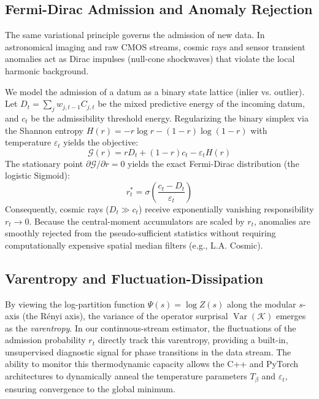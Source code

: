 \subsection{Fermi-Dirac Admission and Anomaly Rejection}
The same variational principle governs the admission of new data. In astronomical imaging and raw CMOS streams, cosmic rays and sensor transient anomalies act as Dirac impulses (null-cone shockwaves) that violate the local harmonic background.

We model the admission of a datum as a binary state lattice (inlier vs. outlier). Let $D_t = \sum_j w_{j,t-1} C_{j,t}$ be the mixed predictive energy of the incoming datum, and $c_t$ be the admissibility threshold energy. Regularizing the binary simplex via the Shannon entropy $H(r) = -r \log r - (1-r) \log (1-r)$ with temperature $\varepsilon_t$ yields the objective:
\begin{equation}
    \mathcal{G}(r) = r D_t + (1-r)c_t - \varepsilon_t H(r)
\end{equation}
The stationary point $\partial \mathcal{G} / \partial r = 0$ yields the exact Fermi-Dirac distribution (the logistic Sigmoid):
\begin{equation}
    r_t^* = \sigma \left( \frac{c_t - D_t}{\varepsilon_t} \right)
\end{equation}
Consequently, cosmic rays ($D_t \gg c_t$) receive exponentially vanishing responsibility $r_t \to 0$. Because the central-moment accumulators are scaled by $r_t$, anomalies are smoothly rejected from the pseudo-sufficient statistics without requiring computationally expensive spatial median filters (e.g., L.A. Cosmic).

\subsection{Varentropy and Fluctuation-Dissipation}
By viewing the log-partition function $\Psi(s) = \log Z(s)$ along the modular $s$-axis (the Rényi axis), the variance of the operator surprisal $\operatorname{Var}(\mathcal{K})$ emerges as the \textit{varentropy}. In our continuous-stream estimator, the fluctuations of the admission probability $r_t$ directly track this varentropy, providing a built-in, unsupervised diagnostic signal for phase transitions in the data stream. The ability to monitor this thermodynamic capacity allows the C++ and PyTorch architectures to dynamically anneal the temperature parameters $T_\beta$ and $\varepsilon_t$, ensuring convergence to the global minimum.
